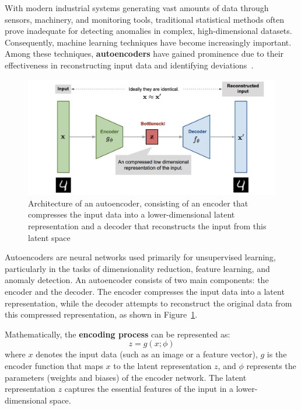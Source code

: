 \documentclass[12pt,DIV14,BCOR12mm,a4paper,footinclude=false,headinclude,parskip=half-,twoside,openright,cleardoublepage=empty,toc=index,bibliography=totoc,listof=totoc]{scrreprt}
\numberwithin{equation}{chapter}
\begin{document}
With modern industrial systems generating vast amounts of data through sensors, machinery, and monitoring tools, traditional statistical methods often prove inadequate for detecting anomalies in complex, high-dimensional datasets. Consequently, machine learning techniques have become increasingly important. Among these techniques, \textbf{autoencoders} have gained prominence due to their effectiveness in reconstructing input data and identifying deviations~\cite{torabi2023practical}.
\begin{figure}
	\centering
	\includegraphics[scale=.55]{../media/autoencoder-architecture.png}
	\caption{Architecture of an autoencoder, consisting of an encoder that compresses the input data into a lower-dimensional latent representation and a decoder that reconstructs the input from this latent space~\cite{Khandelwal:2021}}
	\label{autoencoder}
\end{figure}

Autoencoders are neural networks used primarily for unsupervised learning, particularly in the tasks of dimensionality reduction, feature learning, and anomaly detection. An autoencoder consists of two main components: the encoder and the decoder. The encoder compresses the input data into a latent representation, while the decoder attempts to reconstruct the original data from this compressed representation, as shown in Figure~\ref{autoencoder}.

Mathematically, the \textbf{encoding process} can be represented as:
\begin{equation}
z = g(x; \phi)
\end{equation}
where \( x \) denotes the input data (such as an image or a feature vector), \( g \) is the encoder function that maps \( x \) to the latent representation \( z \), and \( \phi \) represents the parameters (weights and biases) of the encoder network. The latent representation \( z \) captures the essential features of the input in a lower-dimensional space.
\end{document}
